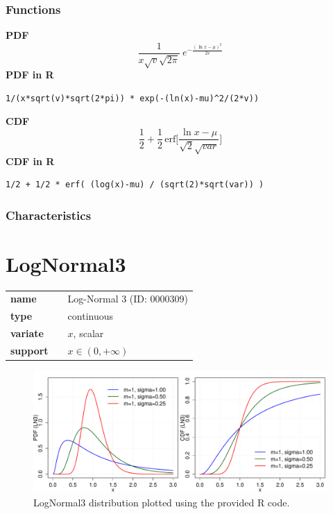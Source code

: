 \subsubsection*{Functions}

\smallskip \noindent \hspace{.2cm} \textbf{PDF} 
\begin{equation*}\frac{1}{x\sqrt{v}\sqrt{2\pi}}\ e^{-\frac{\left(\ln x-\mu\right)^2}{2 v}}\end{equation*}
\smallskip \noindent \hspace{.2cm} \textbf{PDF in R}  
\begin{verbatim}1/(x*sqrt(v)*sqrt(2*pi)) * exp(-(ln(x)-mu)^2/(2*v))\end{verbatim}
\smallskip \noindent \hspace{.2cm} \textbf{CDF} 
\begin{equation*}\frac12 + \frac12\,\text{erf}\Big[\frac{\ln x-\mu}{\sqrt{2}\sqrt{var}}\Big]\end{equation*}
\smallskip \noindent \hspace{.2cm} \textbf{CDF in R} 
\begin{verbatim}1/2 + 1/2 * erf( (log(x)-mu) / (sqrt(2)*sqrt(var)) )\end{verbatim}
\smallskip
\subsubsection*{Characteristics}
\smallskip
\section*{LogNormal3} 

  \bigskip 

\begin{tabular}{p{2cm}cl}
\textbf{name} & & Log-Normal 3 (ID: 0000309)\\ 
 
\textbf{type} & & continuous \\ 

\textbf{variate} & & $x$, scalar \\ 

\textbf{support} & & $x \in (0,+\infty)$
\end{tabular}

\begin{figure}[ht!]
\centering
  \includegraphics[width=140mm]{pics/LogNormal3.pdf}
 \caption{LogNormal3 distribution plotted using the provided R code.}
 \label{fig:LogNormal3}
\end{figure}

